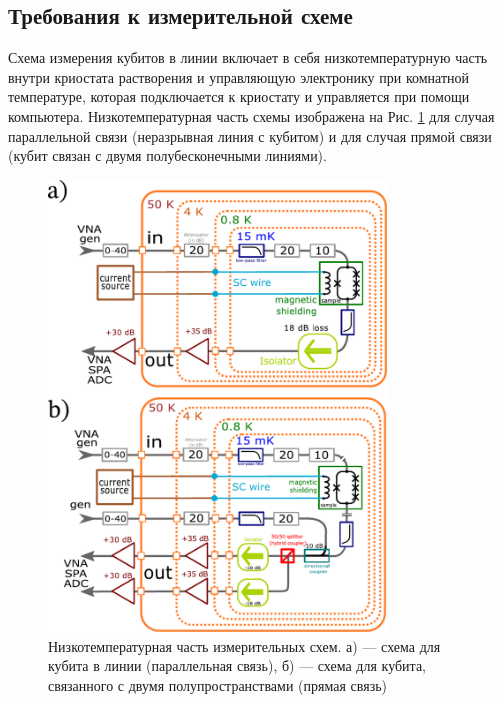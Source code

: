 \subsection{Требования к измерительной схеме}
Схема измерения кубитов в линии включает в себя низкотемпературную часть внутри криостата растворения и управляющую электронику при комнатной температуре, которая подключается к криостату и управляется при помощи компьютера. Низкотемпературная часть схемы изображена на Рис. \ref{fig: schemes} для случая параллельной связи (неразрывная линия с кубитом) и для случая прямой связи (кубит связан с двумя полубесконечными линиями). 
\begin{figure}[htb]\centering
	\includegraphics[width=0.8\textwidth]{images/meas_schemes_2.pdf} \hfill
	\caption{Низкотемпературная часть измерительных схем. а) --- схема для кубита в линии (параллельная связь), б) --- схема для кубита, связанного с двумя полупространствами (прямая связь) }
	\label{fig: schemes}
\end{figure}


